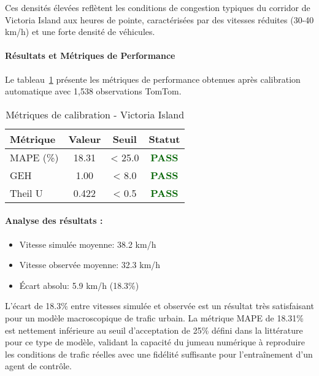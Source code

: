 Ces densités élevées reflètent les conditions de congestion typiques du corridor de Victoria Island
aux heures de pointe, caractérisées par des vitesses réduites (30-40 km/h) et une forte densité
de véhicules.

\paragraph{Résultats et Métriques de Performance}

Le tableau~\ref{tab:calibration_metrics_74} présente les métriques de performance
obtenues après calibration automatique avec 1,538 observations TomTom.

\begin{table}[h]
    \centering
    \caption{Métriques de calibration - Victoria Island}
    \label{tab:calibration_metrics_74}
    \begin{tabular}{|l|c|c|c|}
        \hline
        \textbf{Métrique} & \textbf{Valeur} & \textbf{Seuil} & \textbf{Statut}                      \\
        \hline
        MAPE (\%)         & 18.31           & < 25.0         & \textcolor{darkgreen}{\textbf{PASS}} \\
        GEH               & 1.00            & < 8.0          & \textcolor{darkgreen}{\textbf{PASS}} \\
        Theil U           & 0.422           & < 0.5          & \textcolor{darkgreen}{\textbf{PASS}} \\
        \hline
    \end{tabular}
\end{table}

\paragraph{Analyse des résultats :}
\begin{itemize}
    \item Vitesse simulée moyenne: 38.2 km/h
    \item Vitesse observée moyenne: 32.3 km/h
    \item Écart absolu: 5.9 km/h (18.3\%)
\end{itemize}

L'écart de 18.3\% entre vitesses simulée et observée est un résultat très satisfaisant pour un modèle
macroscopique de trafic urbain. La métrique MAPE de 18.31\% est nettement inférieure
au seuil d'acceptation de 25\% défini dans la littérature pour ce type de modèle, validant la capacité du jumeau numérique à reproduire les
conditions de trafic réelles avec une fidélité suffisante pour l'entraînement d'un agent de contrôle.

